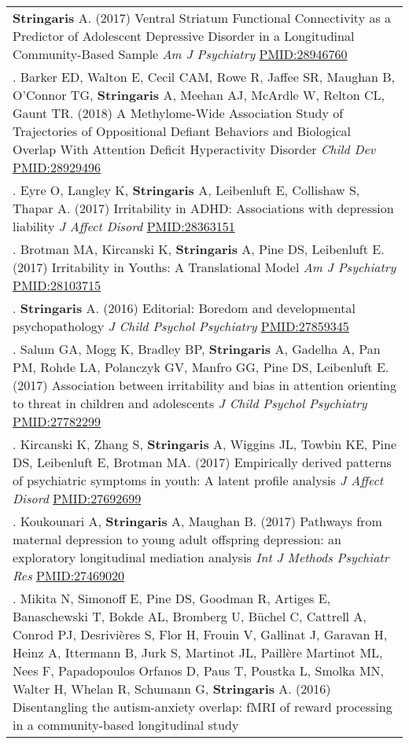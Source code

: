 \documentclass[
]{article}
\begin{document}
\begin{longtable}[]{@{}
  >{\raggedright\arraybackslash}p{}@{}}
\textbf{Stringaris} A. (2017) Ventral Striatum Functional Connectivity
as a Predictor of Adolescent Depressive Disorder in a Longitudinal
Community-Based Sample \emph{Am J Psychiatry} \url{PMID:28946760} \\
115. Barker ED, Walton E, Cecil CAM, Rowe R, Jaffee SR, Maughan B,
O'Connor TG, \textbf{Stringaris} A, Meehan AJ, McArdle W, Relton CL,
Gaunt TR. (2018) A Methylome-Wide Association Study of Trajectories of
Oppositional Defiant Behaviors and Biological Overlap With Attention
Deficit Hyperactivity Disorder \emph{Child Dev} \url{PMID:28929496} \\
116. Eyre O, Langley K, \textbf{Stringaris} A, Leibenluft E, Collishaw
S, Thapar A. (2017) Irritability in ADHD: Associations with depression
liability \emph{J Affect Disord} \url{PMID:28363151} \\
117. Brotman MA, Kircanski K, \textbf{Stringaris} A, Pine DS, Leibenluft
E. (2017) Irritability in Youths: A Translational Model \emph{Am J
Psychiatry} \url{PMID:28103715} \\
118. \textbf{Stringaris} A. (2016) Editorial: Boredom and developmental
psychopathology \emph{J Child Psychol Psychiatry} \url{PMID:27859345} \\
119. Salum GA, Mogg K, Bradley BP, \textbf{Stringaris} A, Gadelha A, Pan
PM, Rohde LA, Polanczyk GV, Manfro GG, Pine DS, Leibenluft E. (2017)
Association between irritability and bias in attention orienting to
threat in children and adolescents \emph{J Child Psychol Psychiatry}
\url{PMID:27782299} \\
120. Kircanski K, Zhang S, \textbf{Stringaris} A, Wiggins JL, Towbin KE,
Pine DS, Leibenluft E, Brotman MA. (2017) Empirically derived patterns
of psychiatric symptoms in youth: A latent profile analysis \emph{J
Affect Disord} \url{PMID:27692699} \\
121. Koukounari A, \textbf{Stringaris} A, Maughan B. (2017) Pathways
from maternal depression to young adult offspring depression: an
exploratory longitudinal mediation analysis \emph{Int J Methods
Psychiatr Res} \url{PMID:27469020} \\
122. Mikita N, Simonoff E, Pine DS, Goodman R, Artiges E, Banaschewski
T, Bokde AL, Bromberg U, Büchel C, Cattrell A, Conrod PJ, Desrivières S,
Flor H, Frouin V, Gallinat J, Garavan H, Heinz A, Ittermann B, Jurk S,
Martinot JL, Paillère Martinot ML, Nees F, Papadopoulos Orfanos D, Paus
T, Poustka L, Smolka MN, Walter H, Whelan R, Schumann G,
\textbf{Stringaris} A. (2016) Disentangling the autism-anxiety overlap:
fMRI of reward processing in a community-based longitudinal study

\end{longtable}
\end{document}
